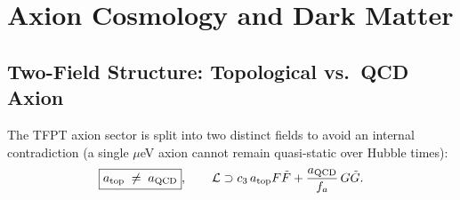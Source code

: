 \section{Axion Cosmology and Dark Matter}

\subsection{Two-Field Structure: Topological vs.\ QCD Axion}

The TFPT axion sector is split into two distinct fields to avoid an internal
contradiction (a single $\mu$eV axion cannot remain quasi-static over Hubble times):
\begin{equation}
    \boxed{a_{\text{top}} \;\neq\; a_{\text{QCD}}},
    \qquad
    \mathcal{L} \supset c_3\, a_{\text{top}} F\tilde{F}
    + \frac{a_{\text{QCD}}}{f_a}\,G\tilde{G}.
\end{equation}

